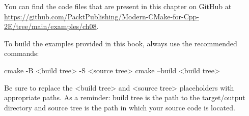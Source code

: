 You can find the code files that are present in this chapter on GitHub at \url{https://github.com/PacktPublishing/Modern-CMake-for-Cpp-2E/tree/main/examples/ch08}.

To build the examples provided in this book, always use the recommended commands:

\begin{shell}
cmake -B <build tree> -S <source tree>
cmake --build <build tree>
\end{shell}

Be sure to replace the <build tree> and <source tree> placeholders with appropriate paths. As a reminder: build tree is the path to the target/output directory and source tree is the path in which your source code is located.

























